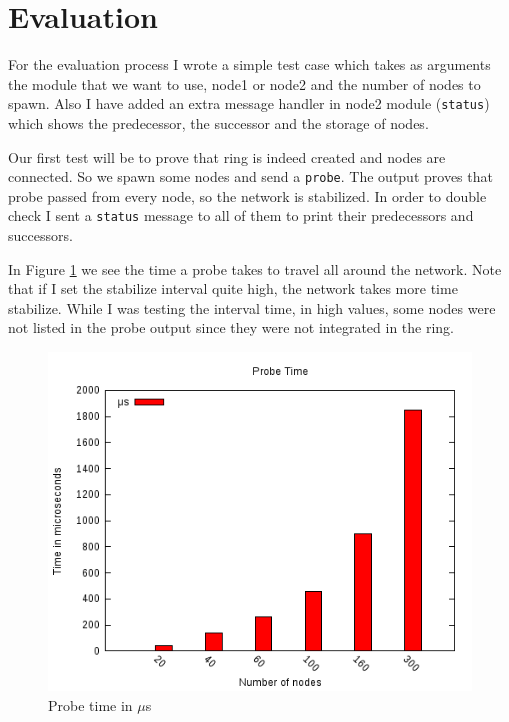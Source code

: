 \documentclass[a4paper, 10pt]{article}
\begin{document}
\section{Evaluation}

For the evaluation process I wrote a simple test case which takes as arguments
the module that we want to use, node1 or node2 and the number of nodes to spawn.
Also I have added an extra message handler in node2 module (\texttt{status}) which shows the
predecessor, the successor and the storage of nodes. 

Our first test will be to prove that ring is indeed created and nodes are
connected. So we spawn some nodes and send a \texttt{probe}. The output proves
that probe passed from every node, so the network is stabilized. In order to
double check I sent a \texttt{status} message to all of them to print their
predecessors and successors.

In Figure \ref{fig:probe_tt} we see the time a probe takes to travel all around
the network. Note that if I set the stabilize interval quite high, the network
takes more time stabilize. While I was testing the interval time, in high
values, some nodes were not listed in the probe output since they were not
integrated in the ring.

\begin{figure}[h!]
\begin{center}
    \includegraphics[scale=0.4]{histograms/probe_tt.png}
    \caption{Probe time in $\mu$s}
    \label{fig:probe_tt}
\end{center}
\end{figure}
\end{document}
